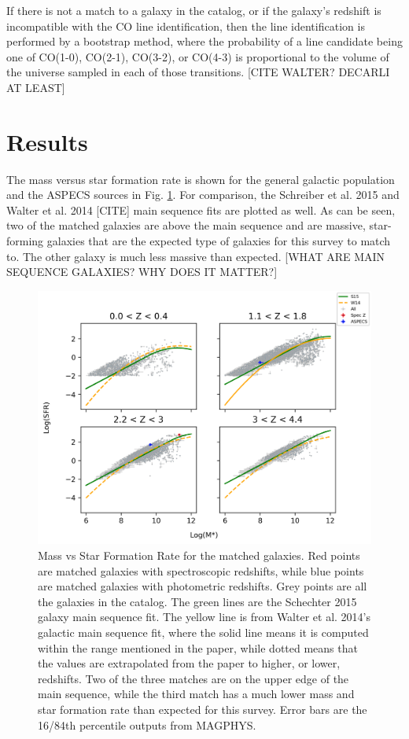 If there is not a match to a galaxy in the catalog, or if the galaxy's redshift is incompatible with the CO line identification, then the line identification is performed by a bootstrap method, where the probability of a line candidate being one of CO(1-0), CO(2-1), CO(3-2), or CO(4-3) is proportional to the volume of the universe sampled in each of those transitions. [CITE WALTER? DECARLI AT LEAST] 

\section{Results}

The mass versus star formation rate is shown for the general galactic population and the ASPECS sources in Fig. \ref{fig:Cross_match}. For comparison, the Schreiber et al. 2015 \cite{schreiber2015herschel} and Walter et al. 2014 [CITE] main sequence fits are plotted as well. As can be seen, two of the matched galaxies are above the main sequence and are massive, star-forming galaxies that are the expected type of galaxies for this survey to match to. The other galaxy is much less massive than expected. [WHAT ARE MAIN SEQUENCE GALAXIES? WHY DOES IT MATTER?]

\begin{figure}[tbp]
\centering \includegraphics[width=120mm]{Survey/No_Cut_Mstar_vs_SFR_all_closest_sep_1_0_sn_fid_60.png}
\caption{Mass vs Star Formation Rate for the matched galaxies. Red points are matched galaxies with spectroscopic redshifts, while blue points are matched galaxies with photometric redshifts. Grey points are all the galaxies in the catalog. The green lines are the Schechter 2015 galaxy main sequence fit. The yellow line is from Walter et al. 2014's galactic main sequence fit, where the solid line means it is computed within the range mentioned in the paper, while dotted means that the values are extrapolated from the paper to higher, or lower, redshifts. Two of the three matches are on the upper edge of the main sequence, while the third match has a much lower mass and star formation rate than expected for this survey. Error bars are the 16/84th percentile outputs from MAGPHYS.}
\label{fig:Cross_match}
\end{figure}

